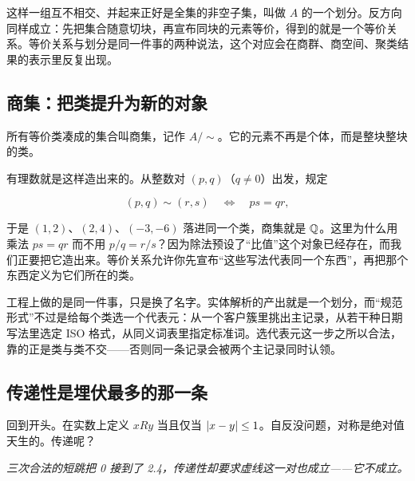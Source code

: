 这样一组互不相交、并起来正好是全集的非空子集，叫做 \(A\) 的一个划分。反方向同样成立：先把集合随意切块，再宣布同块的元素等价，得到的就是一个等价关系。等价关系与划分是同一件事的两种说法，这个对应会在商群、商空间、聚类结果的表示里反复出现。

\subsection{商集：把类提升为新的对象}

所有等价类凑成的集合叫商集，记作 \(A/{\sim}\)。它的元素不再是个体，而是整块整块的类。

有理数就是这样造出来的。从整数对 \((p,q)\)（\(q\neq 0\)）出发，规定

\[
(p,q)\sim(r,s) \quad\Longleftrightarrow\quad ps=qr,
\]

于是 \((1,2)\)、\((2,4)\)、\((-3,-6)\) 落进同一个类，商集就是 \(\mathbb{Q}\)。这里为什么用乘法 \(ps=qr\) 而不用 \(p/q=r/s\)？因为除法预设了``比值''这个对象已经存在，而我们正要把它造出来。等价关系允许你先宣布``这些写法代表同一个东西''，再把那个东西定义为它们所在的类。

工程上做的是同一件事，只是换了名字。实体解析的产出就是一个划分，而``规范形式''不过是给每个类选一个代表元：从一个客户簇里挑出主记录，从若干种日期写法里选定 ISO 格式，从同义词表里指定标准词。选代表元这一步之所以合法，靠的正是类与类不交——否则同一条记录会被两个主记录同时认领。

\subsection{传递性是埋伏最多的那一条}

回到开头。在实数上定义 \(xRy\) 当且仅当 \(\left|x-y\right|\le 1\)。自反没问题，对称是绝对值天生的。传递呢？

\begin{center}

\emph{三次合法的短跳把 0 接到了 2.4，传递性却要求虚线这一对也成立——它不成立。}
\end{center}

